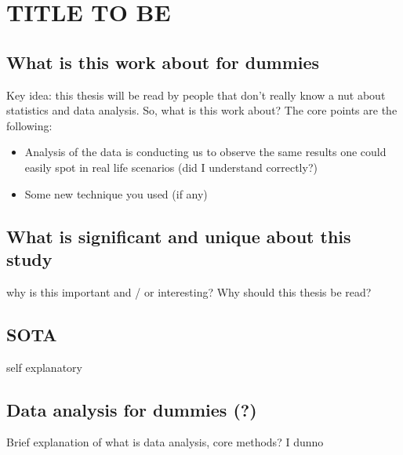 \chapter{TITLE TO BE}

\section{What is this work about for dummies}
Key idea: this thesis will be read by people that don't really know a nut about statistics and data analysis. 
So, what is this work about? 
The core points are the following:
\begin{itemize}
    \item Analysis of the data is conducting us to observe the same results one could easily spot in real life scenarios (did I understand correctly?)
    \item Some new technique you used (if any)
\end{itemize}
\section{What is significant and unique about this study}
why is this important and / or interesting? Why should this thesis be read?
\section{SOTA}
self explanatory
\section{Data analysis for dummies (?)}
Brief explanation of what is data analysis, core methods? I dunno
